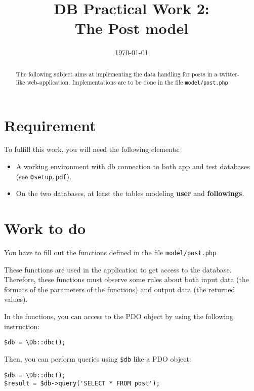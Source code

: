 \documentclass[twoside,a4paper,12pt]{article}
\title{DB Practical Work 2:\\The Post model}
\date{\today}
\begin{document}
\maketitle

\begin{abstract}
  The following subject aims at implementing the data handling for posts in a twitter-like web-application. Implementations are to be done in the file \texttt{model/post.php}
\end{abstract}

\tableofcontents

\clearpage

\section{Requirement}
To fulfill this work, you will need the following elements:

\begin{itemize}
\item A working environment with db connection to both app and test databases (see \texttt{0setup.pdf}).
\item On the two databases, at least the tables modeling \textbf{user} and \textbf{followings}.
\end{itemize}

\section{Work to do}
You have to fill out the functions defined in the file \texttt{model/post.php}

These functions are used in the application to get access to the database. Therefore, these functions must observe some rules about both input data (the formats of the parameters of the functions) and output data (the returned values).

In the functions, you can access to the PDO object by using the following instruction:

\begin{lstlisting}
$db = \Db::dbc();
\end{lstlisting}

Then, you can perform queries using \texttt{\$db} like a PDO object:
\begin{lstlisting}
$db = \Db::dbc();
$result = $db->query('SELECT * FROM post');
\end{lstlisting}
\end{document}

